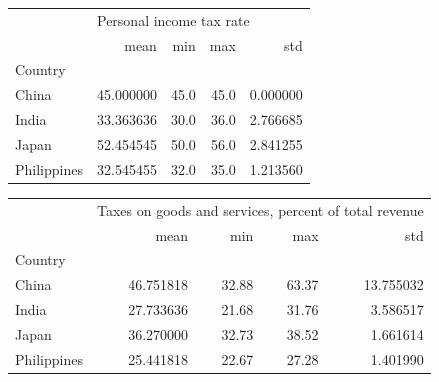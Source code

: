 \documentclass[11pt]{article}
\begin{document}
\begin{flushleft}
\vspace{2em}

\begin{tabular}{lrrrr}
\toprule
{} & \multicolumn{4}{l}{Personal income tax rate} \\
{} &                     mean &   min &   max &       std \\
Country     &                          &       &       &           \\
\midrule
China       &                45.000000 &  45.0 &  45.0 &  0.000000 \\
India       &                33.363636 &  30.0 &  36.0 &  2.766685 \\
Japan       &                52.454545 &  50.0 &  56.0 &  2.841255 \\
Philippines &                32.545455 &  32.0 &  35.0 &  1.213560 \\
\bottomrule
\end{tabular}

\vspace{2em}

\begin{tabular}{lrrrr}
\toprule
{} & \multicolumn{4}{l}{Taxes on goods and services, percent of total revenue} \\
{} &                                                  mean &    min &    max &        std \\
Country     &                                                       &        &        &            \\
\midrule
China       &                                          46.751818 &  32.88 &  63.37 &  13.755032 \\
India       &                                          27.733636 &  21.68 &  31.76 &   3.586517 \\
Japan       &                                          36.270000 &  32.73 &  38.52 &   1.661614 \\
Philippines &                                          25.441818 &  22.67 &  27.28 &   1.401990 \\
\bottomrule
\end{tabular}

\vspace{2em}


\end{flushleft}
\end{document}
